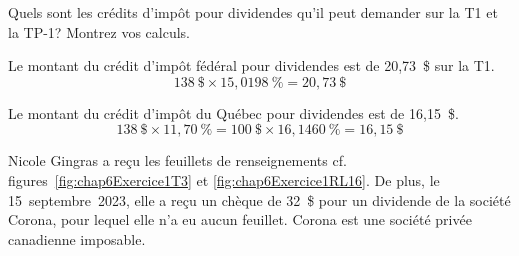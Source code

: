 \begin{sousQuestion}
	Quels sont les crédits d'impôt pour dividendes qu'il peut demander sur la T1 et la TP-1? Montrez vos calculs.
\end{sousQuestion}
Le montant du crédit d'impôt fédéral pour dividendes est de 20,73~\$ sur la T1.
\[ 138~\$ \times 15,0198~\% = 20,73~\$ \]

Le montant du crédit d'impôt du Québec pour dividendes est de 16,15~\$.
\[ 138~\$ \times 11,70~\% = 100~\$ \times 16,1460~\% =  16,15~\$ \]
\begin{question}
	Nicole Gingras a reçu les feuillets de renseignements cf. figures~\ref{fig:chap6Exercice1T3} et \ref{fig:chap6Exercice1RL16}. De plus, le 15~septembre~2023, elle a reçu un chèque de 32~\$ pour un dividende de la société Corona, pour lequel elle n'a eu aucun feuillet. Corona est une société privée canadienne imposable.
	

\end{question}
